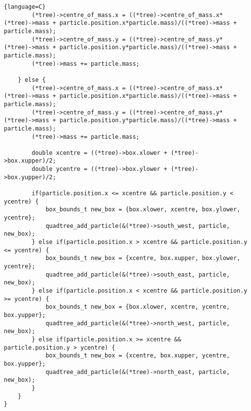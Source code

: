 \documentclass{article}
\begin{document}
\begin{lstlisting}{language=C}
        (*tree)->centre_of_mass.x = ((*tree)->centre_of_mass.x*(*tree)->mass + particle.position.x*particle.mass)/((*tree)->mass + particle.mass);
        (*tree)->centre_of_mass.y = ((*tree)->centre_of_mass.y*(*tree)->mass + particle.position.y*particle.mass)/((*tree)->mass + particle.mass);
        (*tree)->mass += particle.mass;

    } else {
        (*tree)->centre_of_mass.x = ((*tree)->centre_of_mass.x*(*tree)->mass + particle.position.x*particle.mass)/((*tree)->mass + particle.mass);
        (*tree)->centre_of_mass.y = ((*tree)->centre_of_mass.y*(*tree)->mass + particle.position.y*particle.mass)/((*tree)->mass + particle.mass);
        (*tree)->mass += particle.mass;

        double xcentre = ((*tree)->box.xlower + (*tree)->box.xupper)/2;
        double ycentre = ((*tree)->box.ylower + (*tree)->box.yupper)/2;

        if(particle.position.x <= xcentre && particle.position.y < ycentre) {
            box_bounds_t new_box = {box.xlower, xcentre, box.ylower, ycentre};
            quadtree_add_particle(&(*tree)->south_west, particle, new_box);
        } else if(particle.position.x > xcentre && particle.position.y <= ycentre) {
            box_bounds_t new_box = {xcentre, box.xupper, box.ylower, ycentre};
            quadtree_add_particle(&(*tree)->south_east, particle, new_box);
        } else if(particle.position.x < xcentre && particle.position.y >= ycentre) {
            box_bounds_t new_box = {box.xlower, xcentre, ycentre, box.yupper};
            quadtree_add_particle(&(*tree)->north_west, particle, new_box);
        } else if(particle.position.x >= xcentre && particle.position.y > ycentre) {
            box_bounds_t new_box = {xcentre, box.xupper, ycentre, box.yupper};
            quadtree_add_particle(&(*tree)->north_east, particle, new_box);
        }
    }
} 
\end{lstlisting}
\end{document}
